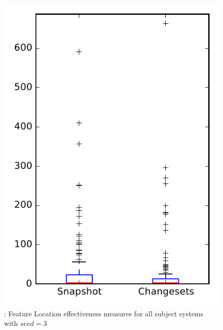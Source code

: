 
\begin{figure}
\centering
\includegraphics[height=0.4\textheight]{figures/flt_seed/rq1_overview_3}
\caption{\rone: Feature Location effectiveness measures for all subject systems with $seed=3$}
\label{fig:flt_seed:rq1:overview}
\end{figure}
